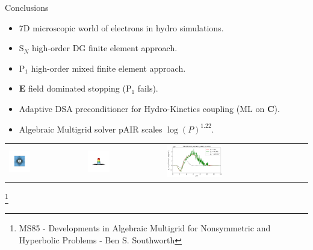 \documentclass[8pt, compress]{beamer}
\newcommand{\vect}[1]{\boldsymbol{#1}}
\newcommand{\matr}[1]{\mathbf{#1}}
\newcommand{\E}{\vect{E}}
\begin{document}
\begin{frame}
\begin{center}
{\huge Conclusions}
\begin{itemize}
  \item 7D microscopic world of electrons in hydro simulations.
  \item S$_N$ high-order DG finite element approach.
  \item P$_1$ high-order mixed finite element approach.
  \item $\E$ field dominated stopping (P$_1$ fails).
  \item Adaptive DSA preconditioner for Hydro-Kinetics coupling (ML on $\matr{C}$).
  \item Algebraic Multigrid solver pAIR scales $\log(P)^{1.22}$.
\end{itemize}
\begin{tabular}{lll}
\includegraphics[width=0.3\textwidth]{../figures/AMR_ALE_density_2D_nobar.png} &
\includegraphics[width=0.3\textwidth]{../figures/AMR_ALE_nonlocal_Te_3D_nobar.png} &
\includegraphics[width=0.4\textwidth]{../figures/C7_Calder_case5_nonlocal_kinetics_noSNB.png}
\end{tabular}
\let\thefootnote\relax\footnote{MS85 - Developments in Algebraic Multigrid for Nonsymmetric and Hyperbolic Problems - Ben S. Southworth}

\end{center}
\end{frame}
\end{document}
